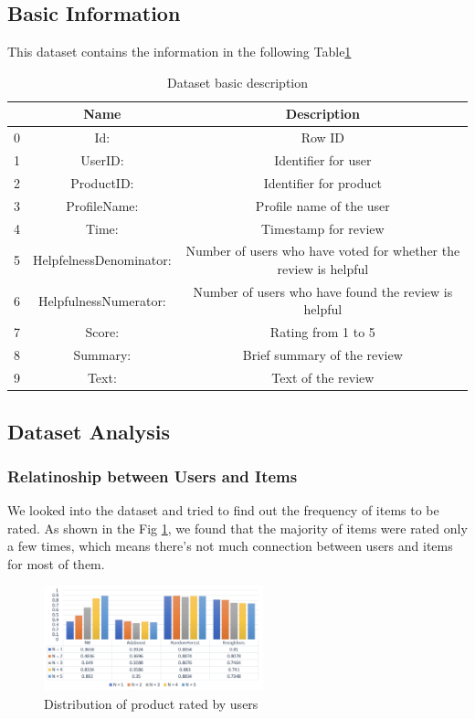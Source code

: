 \documentclass[sigconf]{acmart}
\begin{document}
\subsection{Basic Information}
This dataset contains the information in the following Table\ref{tab:dataset} 

\begin{table}
  \centering
  \caption{Dataset basic description}
  \label{tab:dataset}
  \begin{tabular}{c|c|c}
    \toprule
    & Name & Description \\
    \midrule
    0 & Id: & Row ID\\
    1 & UserID: & Identifier for user\\
    2 & ProductID: & Identifier for product\\
    3 & ProfileName: & Profile name of the user\\
    4 & Time: & Timestamp for review\\
    5 & HelpfelnessDenominator: & Number of users who have voted for whether the review is helpful\\
    6 & HelpfulnessNumerator: & Number of users who have found the review is helpful\\
    7 & Score: & Rating from 1 to 5\\
    8 & Summary: & Brief summary of the review\\
    9 & Text: & Text of the review\\
  \bottomrule
\end{tabular}
\end{table}

\subsection{Dataset Analysis}
\subsubsection{Relatinoship between Users and Items}
We looked into the dataset and tried to find out the frequency of items to be rated. As shown in the Fig \ref{1}, we found that the majority of items were rated only a few times, which means there’s not much connection between users and items for most of them. 
\begin{figure}
  \centering
  \includegraphics[width=2.5in]{4.png}
  \caption{Distribution of product rated by users}
  \label{1}
\end{figure}
\end{document}
